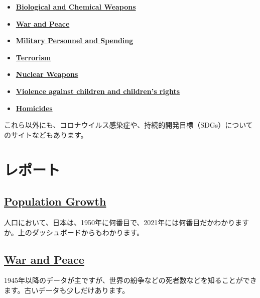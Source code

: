 \documentclass[
  xelatex, ja=standard]{bxjsbook}
\theoremstyle{definition}
\theoremstyle{definition}
\theoremstyle{definition}
\theoremstyle{definition}
\theoremstyle{remark}
\begin{document}
\begin{itemize}
  \begin{itemize}
  \item
    \href{https://ourworldindata.org/biological-and-chemical-weapons}{\textbf{Biological and Chemical Weapons}}
  \item
    \href{https://ourworldindata.org/war-and-peace}{\textbf{War and Peace}}
  \item
    \href{https://ourworldindata.org/military-personnel-spending}{\textbf{Military Personnel and Spending}}
  \item
    \href{https://ourworldindata.org/terrorism}{\textbf{Terrorism}}
  \item
    \href{https://ourworldindata.org/nuclear-weapons}{\textbf{Nuclear Weapons}}
  \item
    \href{https://ourworldindata.org/violence-against-rights-for-children}{\textbf{Violence against children and children's rights}}
  \item
    \href{https://ourworldindata.org/homicides}{\textbf{Homicides}}
  \end{itemize}
\end{itemize}

これら以外にも、コロナウイルス感染症や、持続的開発目標（SDGs）についてのサイトなどもあります。

\hypertarget{ux30ecux30ddux30fcux30c8}{%
\section{レポート}\label{ux30ecux30ddux30fcux30c8}}

\hypertarget{population-growth}{%
\subsection{\texorpdfstring{\href{https://ourworldindata.org/population-growth}{Population Growth}}{Population Growth}}\label{population-growth}}

人口において、日本は、1950年に何番目で、2021年には何番目だかわかりますか。上のダッシュボードからもわかります。

\hypertarget{war-and-peace}{%
\subsection{\texorpdfstring{\href{https://ourworldindata.org/war-and-peace}{War and Peace}}{War and Peace}}\label{war-and-peace}}

1945年以降のデータが主ですが、世界の紛争などの死者数などを知ることができます。古いデータも少しだけあります。
\end{document}
